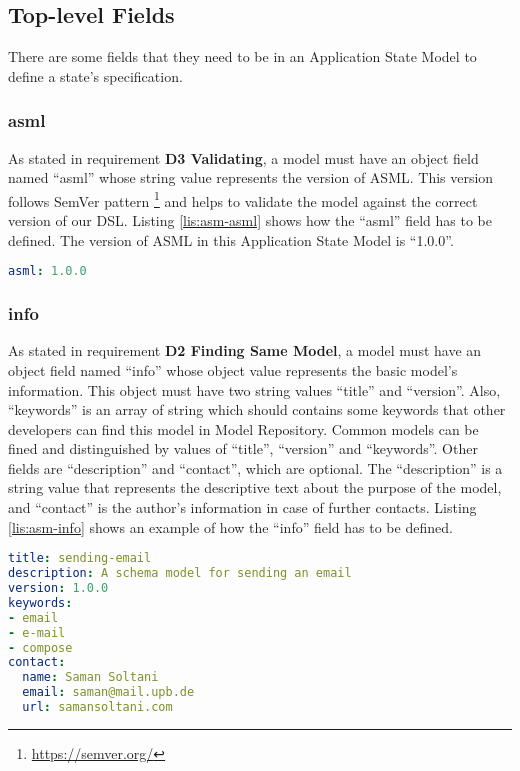 \subsection{Top-level Fields}
There are some fields that they need to be in an Application State Model to define a state’s specification.

\subsubsection{asml}
As stated in requirement \textbf{D3 Validating}, a model must have an object field named “asml” whose string value represents the version of ASML. This version follows SemVer pattern \footnote{\url{https://semver.org/}} and helps to validate the model against the correct version of our DSL. Listing \ref{lis:asm-asml} shows how the “asml” field has to be defined. The version of ASML in this Application State Model is “1.0.0”.

\lstset{
  label=lis:asm-asml, caption=Application State Model “asml” field example., 
}
\begin{lstlisting}[language=yaml]
asml: 1.0.0
\end{lstlisting}
\subsubsection{info}
As stated in requirement \textbf{D2 Finding Same Model}, a model must have an object field named “info” whose object value represents the basic model’s information. This object must have two string values “title” and “version”. Also, “keywords” is an array of string which should contains some keywords that other developers can find this model in Model Repository. Common models can be fined and distinguished by values of “title”, “version” and “keywords”. Other fields are “description” and “contact”, which are optional. The “description” is a string value that represents the descriptive text about the purpose of the model, and “contact” is the author’s information in case of further contacts. Listing \ref{lis:asm-info} shows an example of how the “info” field has to be defined.

\lstset{
  label=lis:asm-info, caption=Application State Model “info” field example. 
}
\begin{lstlisting}[language=yaml]
title: sending-email
description: A schema model for sending an email
version: 1.0.0
keywords:
- email
- e-mail
- compose
contact:
  name: Saman Soltani
  email: saman@mail.upb.de
  url: samansoltani.com

\end{lstlisting}

